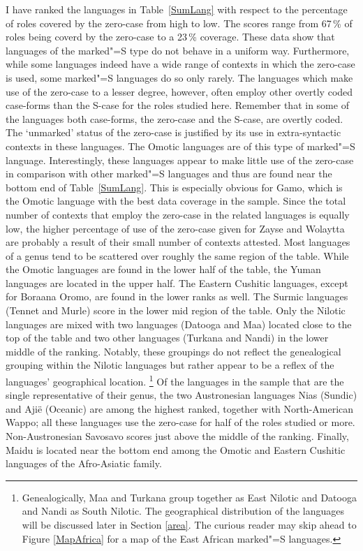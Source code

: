 I have ranked the languages in Table~\ref{SumLang} with respect to the percentage of roles covered by the zero-case from high to low.
The scores range from 67\,\% of roles being coverd by the zero-case to a 23\,\% coverage. 
These data show that languages of the marked"=S type do not behave in a uniform way. 
Furthermore, while some languages indeed have a wide range of contexts in which the zero-case is used, some marked"=S languages do so only rarely.
The languages which make use of the zero-case to a lesser degree, however, often employ other overtly coded case-forms than the S-case for the roles studied here.  
Remember that in some of the languages both case-forms, the zero-case and the S-case, are overtly coded. 
The `unmarked' status of the zero-case is justified by its use in extra-syntactic contexts in these languages. 
The Omotic languages are of this type of marked"=S language. 
Interestingly, these languages appear to make little use of the zero-case in comparison with other marked"=S languages and thus are found near the bottom end of Table~\ref{SumLang}. This is especially obvious for Gamo, which is the Omotic language with the best data coverage in the sample. 
Since the total number of contexts that employ the zero-case in the related languages is equally low, the higher percentage of use of the zero-case given for Zayse and Wolaytta are probably a result of their small number of contexts attested.  
Most languages of a genus tend to be scattered over roughly the same region of the table. 
While the Omotic languages are found in the lower half of the table, the Yuman languages are located in the upper half. 
The Eastern Cushitic languages, except for Boraana Oromo, are found in the lower ranks as well. 
The Surmic languages (Tennet and Murle) score in the lower mid region of the table. 
Only the Nilotic languages are mixed with two languages (Datooga and Maa) located close to the top of the table and two other languages (Turkana and Nandi) in the lower middle of the ranking. 
Notably, these groupings do not reflect the genealogical grouping within the Nilotic languages but rather appear to be a reflex of the languages' geographical location.
\footnote{Genealogically, Maa and Turkana group together as East Nilotic and Datooga and Nandi as South Nilotic. The geographical distribution of the languages will be discussed later in Section \ref{area}. The curious reader may skip ahead to Figure \ref{MapAfrica} for a map of the East African marked"=S languages.}  
Of the languages in the sample that are the single representative of their genus, the two Austronesian languages Nias (Sundic) and Aji\"e (Oceanic) are among the highest ranked, together with North-American Wappo; all these languages use the zero-case for half of the roles studied or more. 
Non-Austronesian Savosavo scores just above the middle of the ranking. 
Finally, Maidu is located near the bottom end among the Omotic and Eastern Cushitic languages of the Afro-Asiatic family.


